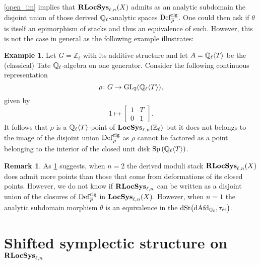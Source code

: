 \documentclass[10pt,a4paper]{amsart}
\numberwithin{equation}{subsection}
\theoremstyle{plain}
\theoremstyle{definition}
\newtheorem{exem}[theorem]{Example}
\newtheorem{rema}[theorem]{Remark}
\theoremstyle{remark}
\numberwithin{equation}{section}
\begin{document}
\cref{open_im} implies that $\mathbf R \mathbf{LocSys}_{\ell, n}(X)$ admits as an analytic subdomain the disjoint union of those derived $\mathbb{Q}_{\ell}$-analytic spaces $\mathbf{\mathrm{Def}}_{\overline{\rho}}^{\mathrm{rig}}$.
One could then ask if $\theta$ is itself an epimorphism of stacks and thus an equivalence of such. However,
this is not the case in general as the following example illustrates:


\begin{exem} \label{ex_surj}
Let $G = \mathbb Z_{\ell}$ with its additive structure and let $A = \mathbb{Q}_{\ell} \langle T \rangle$ be the (classical) Tate $\mathbb{Q}_{\ell}$-algebra on one generator. Consider the following continuous representation
	\[
		\rho \colon G \to \mathrm{GL}_2 (\mathbb{Q}_{\ell} \langle T \rangle),
	\]
given by
	\[
		1 \mapsto 
		\begin{bmatrix}
			1 & T \\
			0 & 1
		\end{bmatrix}.
	\]
It follows that $\rho$ is a $\mathbb{Q}_{\ell} \langle T \rangle$-point of $\mathbf{LocSys}_{\ell, n}( \mathbb Z_{\ell})$ but it does not belongs to the image of the disjoint union $\mathbf{\mathrm{Def}}^{\mathrm{rig}}_{\overline{\rho}}$ as $\rho$ cannot be factored as a point belonging to the interior of the closed unit disk
$\mathrm{Sp} \left( 	\mathbb{Q}_{\ell} \langle T \rangle 		\right)$.
\end{exem}

\begin{rema}
As \cref{ex_surj} suggests, when $n =2$ the derived moduli stack $\mathbf R \mathbf{LocSys}_{\ell, n}(X)$ does admit more points than those that come from deformations of its closed points.
However, we do not know if $\mathbf R \mathbf{LocSys}_{\ell, n}$ can be written as a disjoint union of the closures of $\mathbf{\mathrm{Def}}^{\mathrm{rig}}_{\overline{\rho}}$ in $\mathbf{LocSys}_{\ell, n}(X)$. However, when $n = 1$ the analytic subdomain morphism $\theta$ is an equivalence in the \infcat $\mathrm{dSt} \big( \mathrm{dAfd}_{\mathbb{Q}_\ell},
\tau_{\text{\'et}} \big)$.
\end{rema}




\section{Shifted symplectic structure on $\mathbf R \mathbf{LocSys}_{\ell, n}$}
\end{document}
